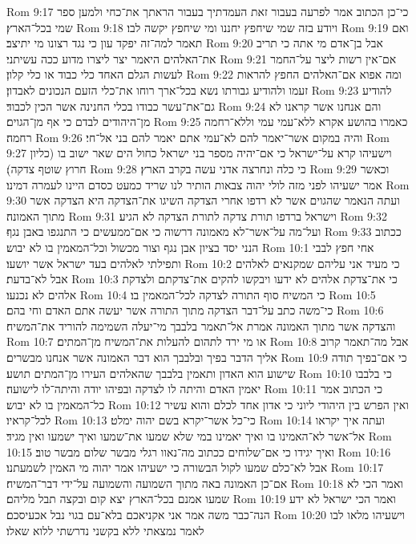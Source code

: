 Rom 9:17  כי־כן הכתוב אמר לפרעה בעבור זאת העמדתיך בעבור הראתך את־כחי ולמען ספר שמי בכל־הארץ׃
Rom 9:18  ויודע בזה שמי שיחפץ יחננו ומי שיחפץ יקשה לבו׃
Rom 9:19  ואם תאמר למה־זה יפקד עון כי נגד רצונו מי יתיצב׃
Rom 9:20  אבל בן־אדם מי אתה כי תריב את־האלהים היאמר יצר ליצרו מדוע ככה עשיתני׃
Rom 9:21  אם־אין רשות ליצר על־החמר לעשות הגלם האחד כלי כבוד או כלי קלון׃
Rom 9:22  ומה אפוא אם־האלהים החפץ להראות זעמו ולהודיע גבורתו נשא בכל־ארך רוחו את־כלי הזעם הנכונים לאבדון׃
Rom 9:23  להודיע גם־את־עשר כבודו בכלי החנינה אשר הכין לכבוד׃
Rom 9:24  והם אנחנו אשר קראנו לא מן־היהודים לבדם כי אף מן־הגוים׃
Rom 9:25  כאמרו בהושע אקרא ללא־עמי עמי וללא־רחמה רחמה׃
Rom 9:26  והיה במקום אשר־יאמר להם לא־עמי אתם יאמר להם בני אל־חי׃
Rom 9:27  וישעיהו קרא על־ישראל כי אם־יהיה מספר בני ישראל כחול הים שאר ישוב בו (כליון חרוץ שוטף צדקה)׃
Rom 9:28  כי כלה ונחרצה אדני עשה בקרב הארץ׃
Rom 9:29  וכאשר אמר ישעיהו לפני מזה לולי יהוה צבאות הותיר לנו שריד כמעט כסדם היינו לעמרה דמינו׃
Rom 9:30  ועתה הנאמר שהגוים אשר לא רדפו אחרי הצדקה השיגו את־הצדקה היא הצדקה אשר מתוך האמונה׃
Rom 9:31  וישראל ברדפו תורת צדקה לתורת הצדקה לא הגיע׃
Rom 9:32  ועל־מה על־אשר־לא מאמונה דרשוה כי אם־ממעשים כי התנגפו באבן נגף׃
Rom 9:33  ככתוב הנני יסד בציון אבן נגף וצור מכשול וכל־המאמין בו לא יבוש׃
Rom 10:1  אחי חפץ לבבי ותפילתי לאלהים בעד ישראל אשר יושעו׃
Rom 10:2  כי מעיד אני עליהם שמקנאים לאלהים אבל לא־בדעת׃
Rom 10:3  כי את־צדקת אלהים לא ידעו ויבקשו להקים את־צדקתם ולצדקת אלהים לא נכנעו׃
Rom 10:4  כי המשיח סוף התורה לצדקה לכל־המאמין בו׃
Rom 10:5  כי־משה כתב על־דבר הצדקה מתוך התורה אשר יעשה אתם האדם וחי בהם׃
Rom 10:6  והצדקה אשר מתוך האמונה אמרת אל־תאמר בלבבך מי־יעלה השמימה להוריד את־המשיח׃
Rom 10:7  או מי ירד לתהום להעלות את־המשיח מן־המתים׃
Rom 10:8  אבל מה־תאמר קרוב אליך הדבר בפיך ובלבבך הוא דבר האמונה אשר אנחנו מבשרים׃
Rom 10:9  כי אם־בפיך תודה שישוע הוא האדון ותאמין בלבבך שהאלהים העירו מן־המתים תושע׃
Rom 10:10  כי בלבבו יאמין האדם והיתה לו לצדקה ובפיהו יודה והיתה־לו לישועה׃
Rom 10:11  כי הכתוב אמר כל־המאמין בו לא יבוש׃
Rom 10:12  ואין הפרש בין היהודי ליוני כי אדון אחד לכלם והוא עשיר לכל־קראיו׃
Rom 10:13  כי־כל אשר־יקרא בשם יהוה ימלט׃
Rom 10:14  ועתה איך יקראו אל־אשר לא־האמינו בו ואיך יאמינו במי שלא שמעו את־שמעו ואיך ישמעו ואין מגיד׃
Rom 10:15  ואיך יגידו כי אם־שלוחים ככתוב מה־נאוו רגלי מבשר שלום מבשר טוב׃
Rom 10:16  אבל לא־כלם שמעו לקול הבשורה כי ישעיהו אמר יהוה מי האמין לשמעתנו׃
Rom 10:17  אם־כן האמונה באה מתוך השמועה והשמועה על־ידי דבר־המשיח׃
Rom 10:18  ואמר הכי לא שמעו אמנם בכל־הארץ יצא קום ובקצה תבל מליהם׃
Rom 10:19  ואמר הכי ישראל לא ידע הנה־כבר משה אמר אני אקניאכם בלא־עם בגוי נבל אכעיסכם׃
Rom 10:20  וישעיהו מלאו לבו לאמר נמצאתי ללא בקשני נדרשתי ללוא שאלו׃
